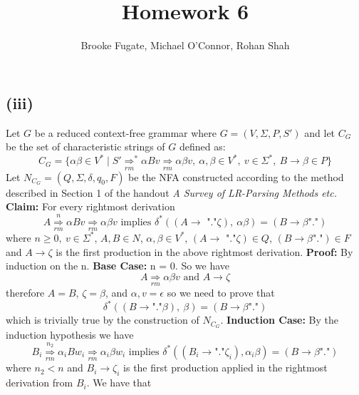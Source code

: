 \documentclass[12pt]{article}
\begin{document}
\pagestyle{plain}
\titleformat{\subsection}[runin]
  {\normalfont\large\bfseries}{\thesubsection}{1em}{}
\titleformat{\subsubsection}[runin]
  {\bfseries}{}{1em}{}

\title{Homework 6}
\author{Brooke Fugate, Michael O'Connor, Rohan Shah}
\date{}

\maketitle

\subsection*{(iii)} Let $G$ be a reduced context-free grammar where
$G = (V,\Sigma,P,S')$ and let $C_G$ be the set of characteristic strings of $G$
defined as:
$$C_G = \{\alpha\beta \in V^* \mid S' \underset{rm}{\Longrightarrow}^* \alpha Bv
\underset{rm}{\Longrightarrow} \alpha\beta v,\ \alpha,\beta \in V^*,\ v\in
\Sigma^*,\ B \rightarrow \beta \in P \}$$
Let $N_{C_G} = (Q,\Sigma,\delta,q_0,F)$ be the NFA constructed according to the
method described in Section 1 of the handout
\textit{A Survey of LR-Parsing Methods etc.}
\medskip\newline
\textbf{Claim:} For every rightmost derivation
$$A \overset{n}{\underset{rm}{\Longrightarrow}} \alpha Bv
\underset{rm}{\Longrightarrow}
\alpha\beta v \text{ implies } \delta^*((A \rightarrow \text{ "."}\zeta)
,\ \alpha\beta) = (B \rightarrow \beta\text{"."})$$
where $n\ge 0,\ v \in \Sigma^*$, $A,B\in N$, $\alpha,\beta\in V^*$,
$(A \rightarrow \text{ "."}\zeta)\in Q$, $(B \rightarrow \beta\text{"."})\in F$
and $A \rightarrow \zeta$ is the first production in the above rightmost
derivation.
\medskip\newline
\textbf{Proof:} By induction on the n.
\medskip\newline
\textbf{Base Case:} n = 0. So we have
$$A \underset{rm}{\Longrightarrow} \alpha\beta v \text{ and } A \rightarrow \zeta$$
therefore $A = B$, $\zeta = \beta$, and $\alpha, v = \epsilon$
so we need to prove that
$$\delta^*((B \rightarrow \text{"."}\beta),\ \beta) =
(B \rightarrow \beta\text{"."})$$
which is trivially true by the construction of $N_{C_G}$.
\medskip\newline
\textbf{Induction Case:} By the induction hypothesis we have
$$B_i \overset{n_2}{\underset{rm}{\Longrightarrow}} \alpha_i Bw_i
\underset{rm}{\Longrightarrow} \alpha_i \beta w_i \text{ implies }
\delta^*((B_i \rightarrow\text{"."}\zeta_i), \alpha_i \beta) =
(B \rightarrow \beta\text{"."})$$
where $n_2 < n$ and $B_i \rightarrow \zeta_i$ is the first production applied
in the rightmost derivation from $B_i$. We have that
\end{document}
